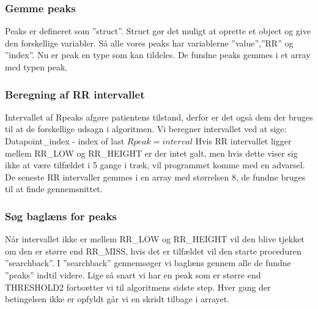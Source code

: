 \documentclass[a4paper,12pt]{article}
\begin{document}
\subsubsection{Gemme peaks}
Peaks er defineret som ”struct”. Struct gør det muligt at oprette et object og give den forskellige variabler. Så alle vores peaks har variablerne ”value”,”RR” og ”index”.
Nu er peak en type som kan tildeles. De fundne peaks gemmes i et array med typen peak. 

\subsubsection{Beregning af RR intervallet}

Intervallet af Rpeaks afgøre patientens tilstand, derfor er det også dem der bruges til at de forskellige udsagn i algoritmen. Vi beregner intervallet ved at sige:
Datapoint\_index  - index of last $Rpeak = interval$
Hvis RR intervallet ligger mellem RR\_LOW og RR\_HEIGHT er der intet galt, men hvis dette viser sig ikke at være tilfældet i 5 gange i træk, vil programmet komme med en advarsel. De seneste RR intervaller gemmes i en array med størrelsen 8, de fundne bruges til at finde gennemsnittet.

\subsubsection{Søg baglæns for peaks}
Når intervallet ikke er mellem RR\_LOW og RR\_HEIGHT vil den blive tjekket om den er større end RR\_MISS, hvis det er tilfældet vil den starte proceduren ”searchback”. 
I ”searchback” gennemsøger vi baglæns gennem alle de fundne ”peaks” indtil videre.
Lige så snart vi har en peak som er større end THRESHOLD2 fortsætter vi til algoritmens sidste step. Hver gang der betingelsen ikke er opfyldt går vi en skridt tilbage i arrayet.
 


\newpage
\end{document}
